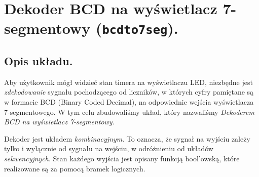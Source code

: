 \documentclass[a4paper,oneside]{report}
\newcommand{\bcdtoseg}{\texttt{bcd\textunderscore to\textunderscore 7seg}}
\begin{document}

\section{Dekoder BCD na wyświetlacz 7-segmentowy (\bcdtoseg).}
\subsection{Opis układu.}
Aby użytkownik mógł widzieć stan timera na wyświetlaczu LED,
niezbędne jest \emph{zdekodowanie} sygnału pochodzącego od
liczników, w których cyfry pamiętane są w formacie BCD (Binary
Coded Decimal), na odpowiednie wejścia wyświetlacza 7-segmentowego.
W tym celu zbudowaliśmy układ, który nazwaliśmy \emph{Dekoderem
BCD na wyświetlacz 7-segmentowy}.

Dekoder jest układem \emph{kombinacyjnym}. To oznacza, że sygnał na
wyjściu zależy tylko i wyłącznie od sygnału na wejściu, w
odróżnieniu od układów \emph{sekwencyjnych}. Stan każdego wyjścia
jest opisany funkcją bool'owską, które realizowane są za pomocą
bramek logicznych.
\end{document}
